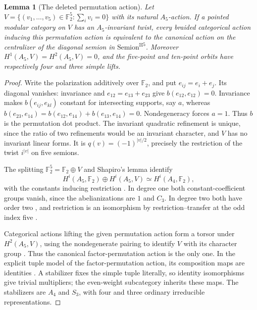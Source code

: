 \documentclass[11pt]{amsart}
\numberwithin{equation}{section}
\newtheorem{lemma}[theorem]{Lemma}
\theoremstyle{definition}
\theoremstyle{plain}
\begin{document}
\begin{lemma}[The deleted permutation action]\label{ext:deleted-action}
Let $V=\{(v_1,\ldots,v_5)\in\mathbb F_2^5:\sum_i v_i=0\}$ with
its natural $A_5$-action. If a pointed modular category on $V$ has
an $A_5$-invariant twist, every braided categorical action inducing
this permutation action is equivalent to the canonical action on the
centralizer of the diagonal semion in $\mathrm{Semion}^{\boxtimes5}$.
Moreover $H^1(A_5,V)=H^2(A_5,V)=0$, and the five-point and ten-point
orbits have respectively four and three simple lifts.
\end{lemma}
\begin{proof}
Write the polarization additively over $\mathbb F_2$, and put
$e_{ij}=e_i+e_j$. Its diagonal vanishes: invariance and
$e_{12}=e_{13}+e_{23}$ give $b(e_{12},e_{12})=0$.
Invariance makes $b(e_{ij},e_{kl})$ constant for intersecting
supports, say $a$, whereas
$b(e_{23},e_{14})=b(e_{12},e_{14})+b(e_{13},e_{14})=0$.
Nondegeneracy forces $a=1$. Thus $b$ is the permutation dot product.
The invariant quadratic refinement is unique, since the ratio of two
refinements would be an invariant character, and $V$ has no invariant
linear forms. It is $q(v)=(-1)^{|v|/2}$, precisely the restriction of
the twist $i^{|v|}$ on five semions.

The splitting $\mathbb F_2^5=\mathbb F_2\oplus V$ and Shapiro's
lemma identify
\[
 H^i(A_5,\mathbb F_2)\oplus H^i(A_5,V)
 \simeq H^i(A_4,\mathbb F_2),
\]
with the constants inducing restriction
\cite[Proposition~3.3 and equation~(3.9)]{BrownLectures}.
In degree one both constant-coefficient groups vanish, since the
abelianizations are $1$ and $C_3$. In degree two both have order two
\cite[\S10]{KraftSchwarz}, and restriction is an isomorphism by
restriction--transfer at the odd index five
\cite[equation~(3.12) and Remark~3.5]{BrownLectures}.

Categorical actions lifting the given permutation action form a torsor
under $H^2(A_5,V)$, using the nondegenerate pairing to identify
$V$ with its character group \cite[\S2.1 and \S4]{GannonJonesPermutation}.
Thus the canonical factor-permutation action is the only one.
In the explicit tuple model of the factor-permutation action, its
composition maps are identities \cite[Proposition~4.1]{GannonJonesPermutation}.
A stabilizer fixes the simple tuple literally, so identity isomorphisms
give trivial multipliers; the even-weight subcategory inherits these
maps. The stabilizers are
$A_4$ and $S_3$, with four and three ordinary irreducible representations.
\end{proof}
\end{document}
